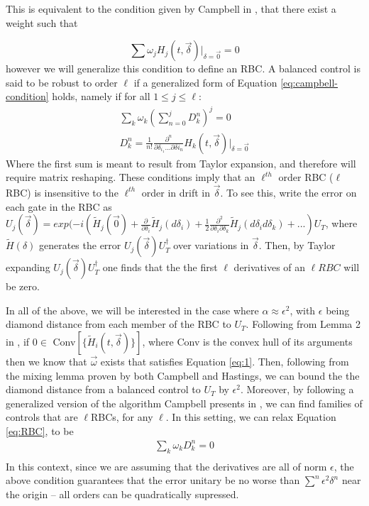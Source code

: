 \documentclass[aps,nofootinbib,pra,notitlepage,twocolumn]{revtex4-1}
\begin{document}
This is equivalent to the condition given by Campbell in \cite{Campbell2017}, that there exist a weight such that

\begin{equation}\label{eq:campbell-condition}
\sum \omega_j H_j(t, \vec{\delta})|_{\delta=\vec{0}} = 0
\end{equation}
however we will generalize this condition to define an RBC. A balanced control is said to be robust to order $\ell$ if a generalized form of Equation \ref{eq:campbell-condition} holds, namely if for all $1 \leq j \leq \ell$:
\begin{equation}\label{eq:RBC}
\begin{gathered}
\sum_k\omega_k(\sum_{n=0}^j D^n_k)^j = 0\\
D^n_k = \frac{1}{n!}\frac{\partial^{n}}{\partial\delta_{i_1}...\partial\delta{i_n}}H_k(t,\vec{\delta})|_{\delta=\vec{0}}
\end{gathered}
\end{equation}
Where the first sum is meant to result from Taylor expansion, and therefore will require matrix reshaping. These conditions imply that an $\ell^{th}$ order RBC ($\ell$RBC) is insensitive to the $\ell^{th}$ order in drift in $\vec{\delta}$. To see this, write the error on each gate in the RBC as $U_j(\vec{\delta}) = exp(-i(\tilde{H}_j(\vec{0}) + \frac{\partial}{\partial\delta_i}\tilde{H}_j(d\delta_i) +  \frac{1}{2}\frac{\partial^2}{\partial\delta_i\partial\delta_k} \tilde{H}_j(d\delta_i d\delta_k) + ...)U_T$, where $\tilde{H}(\delta)$ generates the error $U_j(\vec{\delta})U_T^{\dagger}$ over variations in $\vec{\delta}$. Then, by Taylor expanding $U_j(\vec{\delta})U_T^{\dagger}$ one finds that the the first $\ell$ derivatives of an $\ell RBC$ will be zero.

In all of the above, we will be interested in the case where $\alpha \approx \epsilon^2$, with $\epsilon$ being diamond distance from each member of the RBC to $U_T$. Following from Lemma 2 in \cite{Campbell2017}, if $0\in $ Conv$[\{\tilde{H}_i(t, \vec{\delta})\}]$, where Conv is the convex hull of its arguments then we know that $\vec{\omega}$ exists that satisfies Equation \ref{eq:1}. Then, following from the mixing lemma proven by both Campbell and Hastings\cite{1612.01011}, we can bound the the diamond distance from a balanced control to $U_T$ by $\epsilon^2$. Moreover, by following a generalized version of the algorithm Campbell presents in \cite{Campbell2017}, we can find families of controls that are $\ell$RBCs, for any $\ell$. In this setting, we can relax Equation \ref{eq:RBC}, to be
\begin{equation}\label{eq:RBC-relaxed}
\begin{gathered}
\sum_k\omega_kD^n_k = 0\\
\end{gathered}
\end{equation}
In this context, since we are assuming that the derivatives are all of norm $\epsilon$, the above condition guarantees that the error unitary be no worse than $\sum^n\epsilon^2\delta^n$ near the origin -- all orders can be quadratically supressed.
\end{document}
